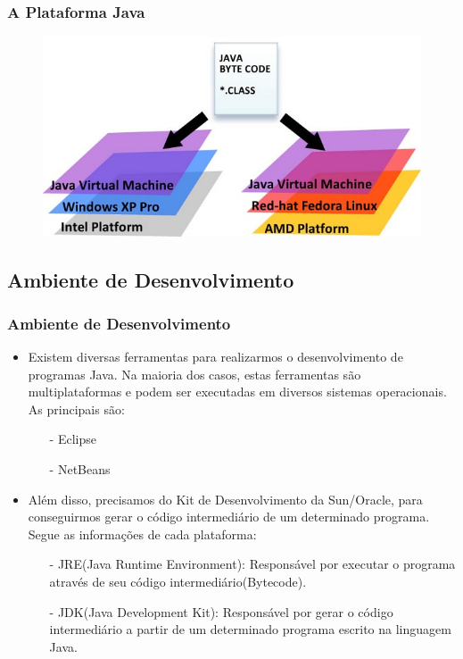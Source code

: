 \documentclass{beamer}
\begin{document}
\begin{frame}
	\frametitle{A Plataforma Java}
	\begin{figure}[h!]
		\centering
		\includegraphics[scale=0.45]{imagens/java-vm}
	\end{figure}
\end{frame}

\subsection{Ambiente de Desenvolvimento}

\begin{frame}
	\frametitle{Ambiente de Desenvolvimento}
	\begin{itemize}
		\item Existem diversas ferramentas para realizarmos o desenvolvimento de programas Java. Na maioria dos casos, estas ferramentas são multiplataformas e podem ser executadas em diversos sistemas operacionais. As principais são:
		\begin{itemize}
			\item[-] Eclipse
			\item[-] NetBeans
		\end{itemize}
		\item Além disso, precisamos do Kit de Desenvolvimento da Sun/Oracle, para conseguirmos gerar o código intermediário de um determinado programa. Segue as informações de cada plataforma:
		\begin{itemize}
			\item[-] JRE(Java Runtime Environment): Responsável por executar o programa através de seu código intermediário(Bytecode).
			\item[-] JDK(Java Development Kit): Responsável por gerar o código intermediário a partir de um determinado programa escrito na linguagem Java.
		\end{itemize} 
	\end{itemize}
\end{frame}
\end{document}
